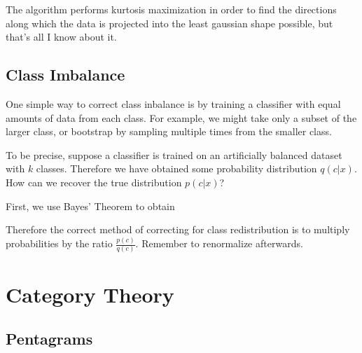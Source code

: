 \documentclass[12pt]{article}
\begin{document}
The algorithm performs kurtosis maximization in order to find the directions along which the data is projected into the least gaussian shape possible, but that's all I know about it.

\subsection{Class Imbalance}

One simple way to correct class inbalance is by training a classifier with equal amounts of data from each class. For example, we might take only a subset of the larger class, or bootstrap by sampling multiple times from the smaller class.

To be precise, suppose a classifier is trained on an artificially balanced dataset with $k$ classes. Therefore we have obtained some probability distribution $q(c|x)$. How can we recover the true distribution $p(c|x)$?

First, we use Bayes' Theorem to obtain

Therefore the correct method of correcting for class redistribution is to multiply probabilities by the ratio $\frac{p(c)}{q(c)}$. Remember to renormalize afterwards.

\section{Category Theory}

\subsection{Pentagrams}

\end{document}
